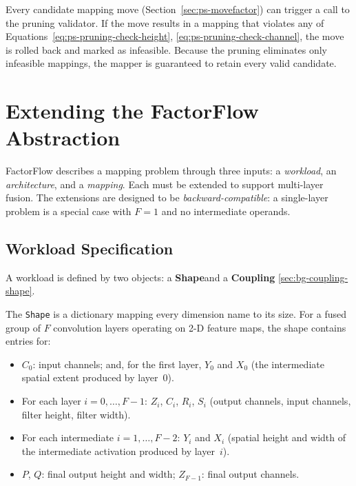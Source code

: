 Every candidate mapping move (Section~\ref{sec:ps-movefactor}) can
trigger a call to the pruning validator.
If the move results in a mapping that violates any of
Equations~\ref{eq:ps-pruning-check-height}, \ref{eq:ps-pruning-check-channel},
the move is rolled back and marked as infeasible.
Because the pruning eliminates only infeasible mappings, the mapper
is guaranteed to retain every valid candidate.




\section{Extending the FactorFlow Abstraction}
\label{sec:ps-abstraction}

FactorFlow describes a mapping problem through three inputs: a
\emph{workload}, an \emph{architecture}, and a \emph{mapping}.
Each must be extended to support multi-layer fusion.
The extensions are designed to be \emph{backward-compatible}: a
single-layer problem is a special case with $F = 1$ and no
intermediate operands.

\subsection{Workload Specification}
\label{sec:ps-workload-spec}

A workload is defined by two objects: a \textbf{Shape}and a
\textbf{Coupling} \ref{sec:bg-coupling-shape}.

The \texttt{Shape} is a dictionary mapping every dimension name to its
size.
For a fused group of $F$ convolution layers operating on 2-D feature
maps, the shape contains entries for:
\begin{itemize}
  \item $C_0$: input channels; and, for the first layer, $Y_0$ and $X_0$
        (the intermediate spatial extent produced by layer~0).
  \item For each layer $i = 0, \dots, F\!-\!1$: $Z_i$, $C_i$, $R_i$, $S_i$
        (output channels, input channels, filter height, filter width).
  \item For each intermediate $i = 1, \dots, F\!-\!2$: $Y_i$ and $X_i$
        (spatial height and width of the intermediate activation produced
        by layer~$i$).
  \item $P$, $Q$: final output height and width; $Z_{F-1}$: final output
        channels.
\end{itemize}

